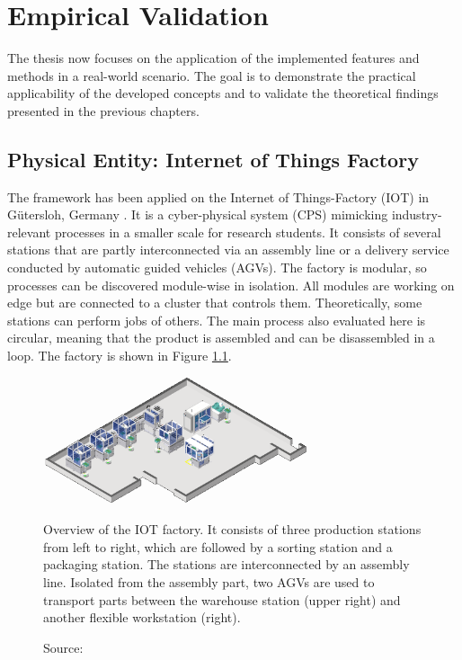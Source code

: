 \chapter{Empirical Validation}
\label{chap:case-study}

The thesis now focuses on the application of the implemented features and methods in a real-world scenario. The goal is to demonstrate the practical applicability of the developed concepts and to validate the theoretical findings presented in the previous chapters.

\section{Physical Entity: Internet of Things Factory}
\label{sec:factory}
The framework has been applied on the Internet of Things-Factory (IOT) in Gütersloh, Germany \autocite{IoTFactory2024}. It is a cyber-physical system (CPS) \autocite{baheti2011cyber} mimicking industry-relevant processes in a smaller scale for research students. It consists of several stations that are partly interconnected via an assembly line or a delivery service conducted by automatic guided vehicles (AGVs). The factory is modular, so processes can be discovered module-wise in isolation. All modules are working on edge but are connected to a cluster that controls them. Theoretically, some stations can perform jobs of others. The main process also evaluated here is circular, meaning that the product is assembled and can be disassembled in a loop. The factory is shown in Figure \ref{fig:iotoverview}.

\begin{figure}[htbp]
  \centering
  \includegraphics[width=0.7\textwidth]{figures/iot1.png}
  \caption[IoT Factory Overview]{Overview of the IOT factory. It consists of three production stations from left to right, which are followed by a sorting station and a packaging station. The stations are interconnected by an assembly line. Isolated from the assembly part, two AGVs are used to transport parts between the warehouse station (upper right) and another flexible workstation (right).}
  \label{fig:iotoverview}
  \caption*{Source: \autocite{IoTFactory2024}}
\end{figure}

